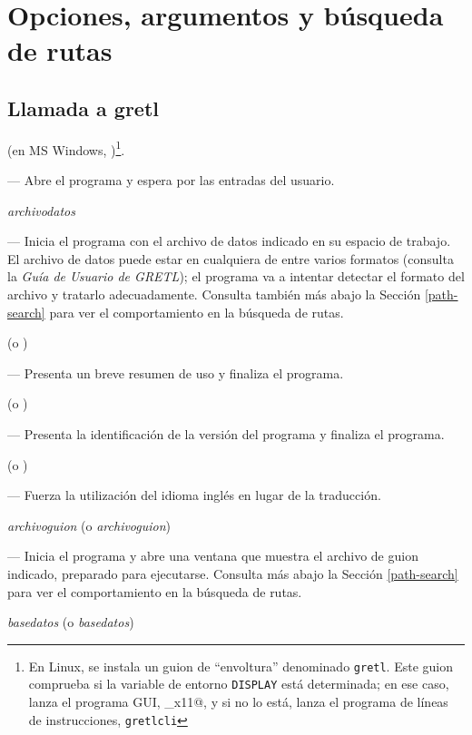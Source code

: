 \chapter{Opciones, argumentos y búsqueda de rutas}
\label{optarg}

\section{Llamada a gretl}
\label{optarg1}

 (en MS Windows, )\footnote{En Linux,
  se instala un guion de ``envoltura'' denominado \texttt{gretl}. Este
  guion comprueba si la variable de entorno \texttt{DISPLAY} está determinada;
  en ese caso, lanza el programa GUI, \verb@gretl_x11@, y si no lo está,
  lanza el programa de líneas de instrucciones, \texttt{gretlcli}}.

--- Abre el programa y espera por las entradas del usuario.
      
 \textsl{archivodatos}
      
--- Inicia el programa con el archivo de datos indicado en su espacio de trabajo.
El archivo de datos puede estar en cualquiera de entre varios formatos (consulta
la \emph{Guía de Usuario de GRETL}); el programa va a intentar detectar el
formato del archivo y tratarlo adecuadamente. Consulta también más abajo la
Sección \ref{path-search} para ver el comportamiento en la búsqueda de rutas.
      
 (o )
      
--- Presenta un breve resumen de uso y finaliza el programa.
      
 (o )
      
--- Presenta la identificación de la versión del programa y finaliza el programa.
      
 (o )
      
--- Fuerza la utilización del idioma inglés en lugar de la traducción.
      
 \textsl{archivoguion} (o 
\textsl{archivoguion})
      
--- Inicia el programa y abre una ventana que muestra el archivo de guion
indicado, preparado para ejecutarse. Consulta más abajo la Sección
\ref{path-search} para ver el comportamiento en la búsqueda de rutas.
      
 \textsl{basedatos} (o 
\textsl{basedatos})

